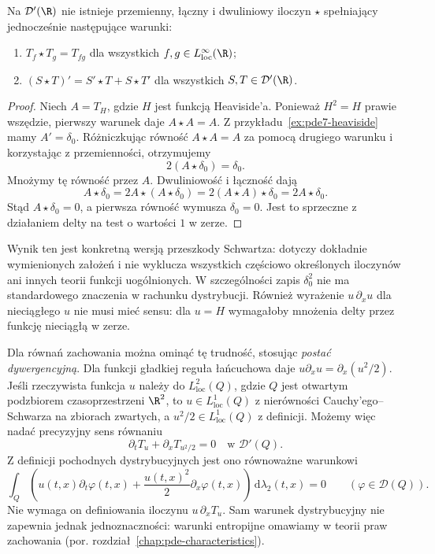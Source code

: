 \begin{stwierdzenie}
Na $\mathcal D'(\R)$ nie istnieje przemienny, łączny
i dwuliniowy iloczyn $\star$ spełniający jednocześnie
następujące warunki:
\begin{enumerate}
\item $T_f\star T_g=T_{fg}$ dla wszystkich
$f,g\in L^\infty_{\mathrm{loc}}(\R)$;
\item $(S\star T)'=S'\star T+S\star T'$ dla wszystkich
$S,T\in\mathcal D'(\R)$.
\end{enumerate}
\end{stwierdzenie}
\begin{proof}
Niech $A=T_H$, gdzie $H$ jest funkcją Heaviside'a.
Ponieważ $H^2=H$ prawie wszędzie, pierwszy warunek
daje $A\star A=A$. Z przykładu~\ref{ex:pde7-heaviside}
mamy $A'=\delta_0$. Różniczkując równość
$A\star A=A$ za pomocą drugiego warunku i korzystając
z przemienności, otrzymujemy
\[
 2(A\star\delta_0)=\delta_0.
\]
Mnożymy tę równość przez $A$. Dwuliniowość i łączność
dają
\[
 A\star\delta_0
 =2A\star(A\star\delta_0)
 =2(A\star A)\star\delta_0
 =2A\star\delta_0.
\]
Stąd $A\star\delta_0=0$, a pierwsza równość
wymusza $\delta_0=0$. Jest to sprzeczne
z działaniem delty na test o wartości $1$ w zerze.
\end{proof}

Wynik ten jest konkretną wersją przeszkody Schwartza:
dotyczy dokładnie wymienionych założeń i nie wyklucza
wszystkich częściowo określonych iloczynów ani
innych teorii funkcji uogólnionych.
W szczególności zapis $\delta_0^2$ nie ma
standardowego znaczenia w rachunku dystrybucji.
Również wyrażenie $u\,\partial_xu$ dla nieciągłego
$u$ nie musi mieć sensu: dla $u=H$ wymagałoby
mnożenia delty przez funkcję nieciągłą w zerze.

Dla równań zachowania można ominąć tę trudność,
stosując \emph{postać dywergencyjną}. Dla funkcji
gładkiej reguła łańcuchowa daje
$u\partial_xu=\partial_x(u^2/2)$.
Jeśli rzeczywista funkcja $u$ należy do
$L^2_{\mathrm{loc}}(Q)$, gdzie $Q$ jest otwartym
podzbiorem czasoprzestrzeni $\R^2$, to
$u\in L^1_{\mathrm{loc}}(Q)$ z nierówności
Cauchy'ego--Schwarza na zbiorach zwartych,
a $u^2/2\in L^1_{\mathrm{loc}}(Q)$ z definicji.
Możemy więc nadać precyzyjny sens równaniu
\[
 \partial_tT_u+\partial_xT_{u^2/2}=0
 \quad\text{w }\mathcal D'(Q).
\]
Z definicji pochodnych dystrybucyjnych jest ono
równoważne warunkowi
\[
 \int_Q
 \left(u(t,x)\partial_t\varphi(t,x)
       +\frac{u(t,x)^2}{2}\partial_x\varphi(t,x)\right)
 \,\mathrm d\lambda_2(t,x)=0
 \qquad(\varphi\in\mathcal D(Q)).
\]
Nie wymaga on definiowania iloczynu
$u\,\partial_xT_u$. Sam warunek dystrybucyjny
nie zapewnia jednak jednoznaczności: warunki
entropijne omawiamy w teorii praw zachowania
(por. rozdział~\ref{chap:pde-characteristics}).

